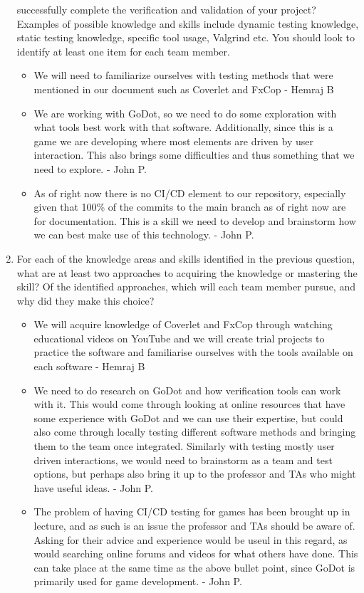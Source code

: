 \documentclass[12pt, titlepage]{article}
\begin{document}
\begin{enumerate}
  successfully complete the verification and validation of your project?
  Examples of possible knowledge and skills include dynamic testing knowledge,
  static testing knowledge, specific tool usage, Valgrind etc.  You should look to
  identify at least one item for each team member.
  \begin{itemize}
    \item We will need to familiarize ourselves with testing methods that were mentioned in our document such as Coverlet and FxCop  - Hemraj B
    \item We are working with GoDot, so we need to do some exploration with what tools best work with that software. Additionally, since this is a game we are developing where most elements are driven by user interaction. This also brings some difficulties and thus something that we need to explore. - John P.
    \item As of right now there is no CI/CD element to our repository, especially given that 100\% of the commits to the main branch as of right now are for documentation. This is a skill we need to develop and brainstorm how we can best make use of this technology. - John P.
  \end{itemize}
  \item For each of the knowledge areas and skills identified in the previous
  question, what are at least two approaches to acquiring the knowledge or
  mastering the skill?  Of the identified approaches, which will each team
  member pursue, and why did they make this choice?
  \begin{itemize}
    \item We will acquire knowledge of Coverlet and FxCop through watching educational videos on YouTube and we will create trial projects to practice the software and familiarise ourselves with the tools available on each software - Hemraj B
    \item We need to do research on GoDot and how verification tools can work with it. This would come through looking at online resources that have some experience with GoDot and we can use their expertise, but could also come through locally testing different software methods and bringing them to the team once integrated. Similarly with testing mostly user driven interactions, we would need to brainstorm as a team and test options, but perhaps also bring it up to the professor and TAs who might have useful ideas. - John P.
    \item The problem of having CI/CD testing for games has been brought up in lecture, and as such is an issue the professor and TAs should be aware of. Asking for their advice and experience would be useul in this regard, as would searching online forums and videos for what others have done. This can take place at the same time as the above bullet point, since GoDot is primarily used for game development. - John P.
  \end{itemize}
\end{enumerate}
\end{document}
